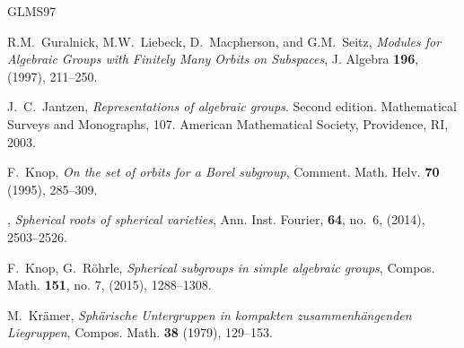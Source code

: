 \documentclass[12pt]{amsart}
\numberwithin{equation}{section}
\theoremstyle{definition}
\begin{document}
\begin{thebibliography}{GLMS97}


 R.M.~Guralnick, M.W.~Liebeck, D.~Macpherson,
  and G.M.~Seitz, \emph{Modules for Algebraic Groups with Finitely
    Many Orbits on Subspaces}, J. Algebra \textbf{196}, (1997),
  211--250.

 J.~C.~Jantzen, \emph{Representations of
    algebraic groups}.  Second edition. Mathematical Surveys and
  Monographs, 107.  American Mathematical Society, Providence, RI,
  2003.


 F.~Knop, \emph{On the set of orbits for a Borel
    subgroup}, Comment. Math. Helv. \textbf{70} (1995), 285--309.


 \bysame, %
  \emph{Spherical roots of spherical varieties}, Ann. Inst. Fourier,
  \textbf{64}, no.~6, (2014), 2503--2526.

 F.~Knop, G.~Röhrle, \emph{Spherical subgroups in
    simple algebraic groups}, Compos. Math. \textbf{151}, no. 7,
  (2015), 1288--1308.

 M.~Krämer, \emph{Sphärische Untergruppen in
    kompakten zusammenhängenden Lie\-gruppen},
  Compos. Math. \textbf{38} (1979), 129--153.







\end{thebibliography}
\end{document}
